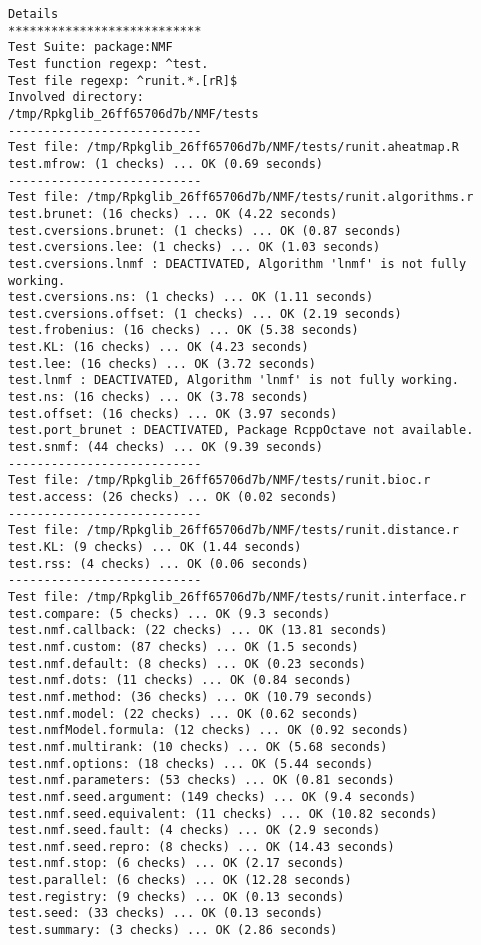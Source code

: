 \documentclass[10pt]{article}\usepackage[]{graphicx}\usepackage[]{color}
\begin{document}
\begin{verbatim}
Details 
*************************** 
Test Suite: package:NMF 
Test function regexp: ^test. 
Test file regexp: ^runit.*.[rR]$ 
Involved directory: 
/tmp/Rpkglib_26ff65706d7b/NMF/tests 
--------------------------- 
Test file: /tmp/Rpkglib_26ff65706d7b/NMF/tests/runit.aheatmap.R 
test.mfrow: (1 checks) ... OK (0.69 seconds)
--------------------------- 
Test file: /tmp/Rpkglib_26ff65706d7b/NMF/tests/runit.algorithms.r 
test.brunet: (16 checks) ... OK (4.22 seconds)
test.cversions.brunet: (1 checks) ... OK (0.87 seconds)
test.cversions.lee: (1 checks) ... OK (1.03 seconds)
test.cversions.lnmf : DEACTIVATED, Algorithm 'lnmf' is not fully working.
test.cversions.ns: (1 checks) ... OK (1.11 seconds)
test.cversions.offset: (1 checks) ... OK (2.19 seconds)
test.frobenius: (16 checks) ... OK (5.38 seconds)
test.KL: (16 checks) ... OK (4.23 seconds)
test.lee: (16 checks) ... OK (3.72 seconds)
test.lnmf : DEACTIVATED, Algorithm 'lnmf' is not fully working.
test.ns: (16 checks) ... OK (3.78 seconds)
test.offset: (16 checks) ... OK (3.97 seconds)
test.port_brunet : DEACTIVATED, Package RcppOctave not available.
test.snmf: (44 checks) ... OK (9.39 seconds)
--------------------------- 
Test file: /tmp/Rpkglib_26ff65706d7b/NMF/tests/runit.bioc.r 
test.access: (26 checks) ... OK (0.02 seconds)
--------------------------- 
Test file: /tmp/Rpkglib_26ff65706d7b/NMF/tests/runit.distance.r 
test.KL: (9 checks) ... OK (1.44 seconds)
test.rss: (4 checks) ... OK (0.06 seconds)
--------------------------- 
Test file: /tmp/Rpkglib_26ff65706d7b/NMF/tests/runit.interface.r 
test.compare: (5 checks) ... OK (9.3 seconds)
test.nmf.callback: (22 checks) ... OK (13.81 seconds)
test.nmf.custom: (87 checks) ... OK (1.5 seconds)
test.nmf.default: (8 checks) ... OK (0.23 seconds)
test.nmf.dots: (11 checks) ... OK (0.84 seconds)
test.nmf.method: (36 checks) ... OK (10.79 seconds)
test.nmf.model: (22 checks) ... OK (0.62 seconds)
test.nmfModel.formula: (12 checks) ... OK (0.92 seconds)
test.nmf.multirank: (10 checks) ... OK (5.68 seconds)
test.nmf.options: (18 checks) ... OK (5.44 seconds)
test.nmf.parameters: (53 checks) ... OK (0.81 seconds)
test.nmf.seed.argument: (149 checks) ... OK (9.4 seconds)
test.nmf.seed.equivalent: (11 checks) ... OK (10.82 seconds)
test.nmf.seed.fault: (4 checks) ... OK (2.9 seconds)
test.nmf.seed.repro: (8 checks) ... OK (14.43 seconds)
test.nmf.stop: (6 checks) ... OK (2.17 seconds)
test.parallel: (6 checks) ... OK (12.28 seconds)
test.registry: (9 checks) ... OK (0.13 seconds)
test.seed: (33 checks) ... OK (0.13 seconds)
test.summary: (3 checks) ... OK (2.86 seconds)

\end{verbatim}
\end{document}
